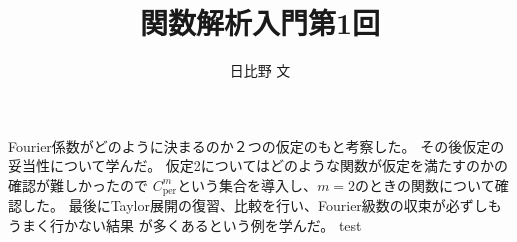 \documentclass[a4paper,10pt]{ltjsarticle}
\begin{document}
\title{関数解析入門第1回}
\author{日比野 文}
\maketitle

Fourier係数がどのように決まるのか２つの仮定のもと考察した。
その後仮定の妥当性について学んだ。
仮定2についてはどのような関数が仮定を満たすのかの確認が難しかったので
$C^m_{\mathrm{per}}$という集合を導入し、$m=2$のときの関数について確認した。
最後にTaylor展開の復習、比較を行い、Fourier級数の収束が必ずしもうまく行かない結果
が多くあるという例を学んだ。
test
\end{document}
